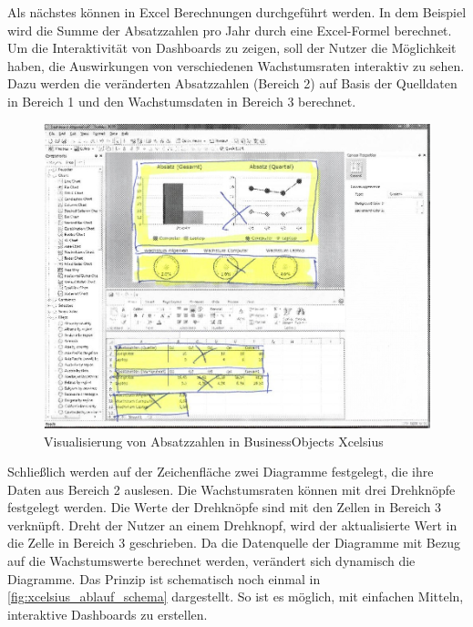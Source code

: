 \begin{onehalfspacing}
Als nächstes können in Excel Berechnungen durchgeführt werden. In dem Beispiel wird die Summe der Absatzzahlen pro Jahr durch eine Excel-Formel berechnet. Um die Interaktivität von Dashboards zu zeigen, soll der Nutzer die Möglichkeit haben, die Auswirkungen von verschiedenen Wachstumsraten interaktiv zu sehen. Dazu werden die veränderten Absatzzahlen (Bereich 2) auf Basis der Quelldaten in Bereich 1 und den Wachstumsdaten in Bereich 3 berechnet.

\begin{figure}[h]
\centering
\setlength{\unitlength}{1mm}
\includegraphics[width=15cm]{images/Xcelsius_UI_Beispiel.jpg}
\caption{Visualisierung von Absatzzahlen in BusinessObjects Xcelsius\label{fig:xcelsius_ui_beispiel}}
\end{figure} 

Schließlich werden auf der Zeichenfläche zwei Diagramme festgelegt, die ihre Daten aus Bereich 2 auslesen. Die Wachstumsraten können mit drei Drehknöpfe festgelegt werden. Die Werte der Drehknöpfe sind mit den Zellen in Bereich 3 verknüpft. Dreht der Nutzer an einem Drehknopf, wird der aktualisierte Wert in die Zelle in Bereich 3 geschrieben. Da die Datenquelle der Diagramme mit Bezug auf die Wachstumswerte berechnet werden, verändert sich dynamisch die Diagramme. Das Prinzip ist schematisch noch einmal in \vref{fig:xcelsius_ablauf_schema} dargestellt. So ist es möglich, mit einfachen Mitteln, interaktive Dashboards zu erstellen.


\end{onehalfspacing}

